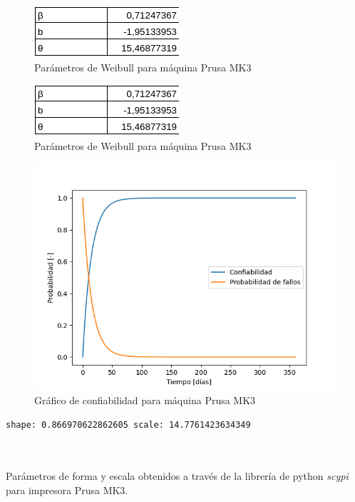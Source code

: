 \begin{figure}[H]
\centering
\includegraphics[scale=0.9]{images/parammk3.png}
\caption{Parámetros de Weibull para máquina Prusa MK3}
\label{paramx350}
\end{figure}

\begin{figure}[H]
\centering
\includegraphics[scale=0.9]{images/parammk3.png}
\caption{Parámetros de Weibull para máquina Prusa MK3}
\label{parammk3}
\end{figure}

\begin{figure}[H]
\centering
\includegraphics[scale=0.9]{images/confmk3.png}
\caption{Gráfico de confiabilidad para máquina Prusa MK3}
\label{confx350}
\end{figure}


\begin{table}[H]
\begin{lstlisting}
shape: 0.866970622862605 scale: 14.7761423634349



\end{lstlisting}
\caption{Parámetros de forma y escala obtenidos a través de la librería de python \textit{scypi} para impresora Prusa MK3.}
\end{table}

